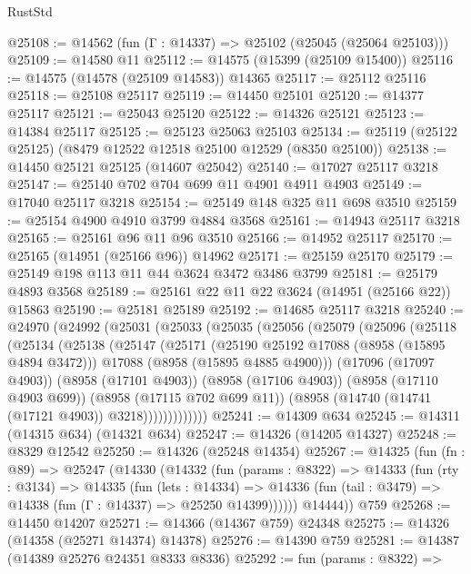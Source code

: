 \begin{lexlean}{RustStd}
\begin{coremodule}
@25108 := @14562 (fun (Γ : @14337) => @25102 (@25045 (@25064 @25103)))
@25109 := @14580 @11
@25112 := @14575 (@15399 (@25109 @15400))
@25116 := @14575 (@14578 (@25109 @14583)) @14365
@25117 := @25112 @25116
@25118 := @25108 @25117
@25119 := @14450 @25101
@25120 := @14377 @25117
@25121 := @25043 @25120
@25122 := @14326 @25121
@25123 := @14384 @25117
@25125 := @25123 @25063 @25103
@25134 := @25119 (@25122 @25125) (@8479 @12522 @12518 @25100 @12529 (@8350 @25100))
@25138 := @14450 @25121 @25125 (@14607 @25042)
@25140 := @17027 @25117 @3218
@25147 := @25140 @702 @704 @699 @11 @4901 @4911 @4903
@25149 := @17040 @25117 @3218
@25154 := @25149 @148 @325 @11 @698 @3510
@25159 := @25154 @4900 @4910 @3799 @4884 @3568
@25161 := @14943 @25117 @3218
@25165 := @25161 @96 @11 @96 @3510
@25166 := @14952 @25117
@25170 := @25165 (@14951 (@25166 @96)) @14962
@25171 := @25159 @25170
@25179 := @25149 @198 @113 @11 @44 @3624 @3472 @3486 @3799
@25181 := @25179 @4893 @3568
@25189 := @25161 @22 @11 @22 @3624 (@14951 (@25166 @22)) @15863
@25190 := @25181 @25189
@25192 := @14685 @25117 @3218
@25240 := @24970
    (@24992
      (@25031
        (@25033
          (@25035
            (@25056
              (@25079
                (@25096
                  (@25118
                    (@25134
                      (@25138
                        (@25147
                          (@25171
                            (@25190 @25192 @17088 (@8958 (@15895 @4894 @3472)))
                            @17088
                            (@8958 (@15895 @4885 @4900)))
                          (@17096 (@17097 @4903))
                          (@8958 (@17101 @4903))
                          (@8958 (@17106 @4903))
                          (@8958 (@17110 @4903 @699))
                          (@8958 (@17115 @702 @699 @11))
                          (@8958 (@14740 (@14741 (@17121 @4903)) @3218)))))))))))))
@25241 := @14309 @634
@25245 := @14311 (@14315 @634) (@14321 @634)
@25247 := @14326 (@14205 @14327)
@25248 := @8329 @12542
@25250 := @14326 (@25248 @14354)
@25267 := @14325
    (fun (fn : @89) =>
    @25247
      (@14330
        (@14332
          (fun (params : @8322) =>
          @14333
            (fun (rty : @3134) =>
            @14335
              (fun (lets : @14334) =>
              @14336 (fun (tail : @3479) => @14338 (fun (Γ : @14337) => @25250 @14399))))))
        @14444))
    @759
@25268 := @14450 @14207
@25271 := @14366 (@14367 @759) @24348
@25275 := @14326 (@14358 (@25271 @14374) @14378)
@25276 := @14390 @759
@25281 := @14387 (@14389 @25276 @24351 @8333 @8336)
@25292 := fun (params : @8322) =>

\end{coremodule}
\end{lexlean}
